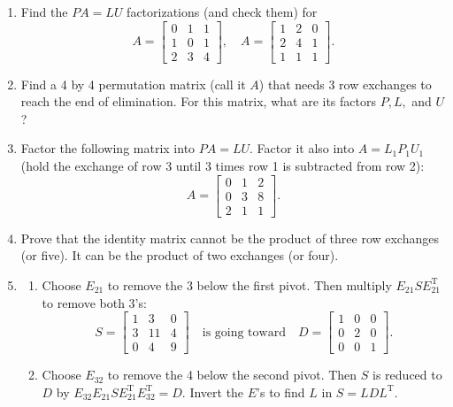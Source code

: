 \documentclass[14pt, a4paper]{article}
\begin{document}
\begin{enumerate}[resume]
    \item Find the $PA = LU$ factorizations (and check them) for
          \[
              A = \begin{bmatrix}0 & 1 & 1 \\ 1 & 0 & 1 \\ 2 & 3 & 4\end{bmatrix},\quad
              A = \begin{bmatrix}1 & 2 & 0 \\ 2 & 4 & 1 \\ 1 & 1 & 1\end{bmatrix}.
          \]

    \item Find a 4 by 4 permutation matrix (call it $A$) that needs 3 row exchanges to reach the end of elimination. For this matrix, what are its factors $P,L,$ and $U$?

    \item Factor the following matrix into $PA = LU$. Factor it also into $A = L_1P_1U_1$ (hold the exchange of row 3 until 3 times row 1 is subtracted from row 2):
          \[
              A = \begin{bmatrix}0 & 1 & 2 \\ 0 & 3 & 8 \\ 2 & 1 & 1\end{bmatrix}.
          \]

    \item Prove that the identity matrix cannot be the product of three row exchanges (or five). It can be the product of two exchanges (or four).

    \item
          \begin{enumerate}
              \item Choose $E_{21}$ to remove the 3 below the first pivot. Then multiply $E_{21}SE_{21}^{\mathrm{T}}$ to remove both 3's:
                    \[
                        S = \begin{bmatrix}1 & 3 & 0 \\ 3 & 11 & 4 \\ 0 & 4 & 9\end{bmatrix} \quad\text{is going toward}\quad D = \begin{bmatrix}1 & 0 & 0 \\ 0 & 2 & 0 \\ 0 & 0 & 1\end{bmatrix}.
                    \]
              \item Choose $E_{32}$ to remove the 4 below the second pivot. Then $S$ is reduced to $D$ by $E_{32}E_{21}SE_{21}^{\mathrm{T}}E_{32}^{\mathrm{T}} = D$. Invert the $E$'s to find $L$ in $S = LDL^{\mathrm{T}}$.
          \end{enumerate}


\end{enumerate}
\end{document}
